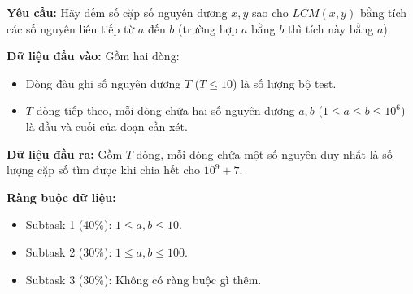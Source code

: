 \documentclass[12pt]{scrartcl}  %
\begin{document}
\textbf{Yêu cầu:}
Hãy đếm số cặp số nguyên dương $x, y$ sao cho $LCM(x, y)$ bằng tích các số nguyên liên tiếp từ $a$ đến $b$ (trường hợp $a$ bằng $b$ thì tích này bằng $a$).

\textbf{Dữ liệu đầu vào:}
Gồm hai dòng:
\begin{itemize}
    \item Dòng đàu ghi số nguyên dương $T$ ($T \leq 10$) là số lượng bộ test.
    \item $T$ dòng tiếp theo, mỗi dòng chứa hai số nguyên dương $a, b$ ($1 \leq a \leq b \leq 10^6$) là đầu và cuối của đoạn cần xét.
\end{itemize}

\textbf{Dữ liệu đầu ra:}
Gồm $T$ dòng, mỗi dòng chứa một số nguyên duy nhất là số lượng cặp số tìm được khi chia hết cho $10^9 + 7$.

\textbf{Ràng buộc dữ liệu:}
\begin{itemize}
    \item Subtask 1 (40\%): $1 \leq a, b \leq 10$.
    \item Subtask 2 (30\%): $1 \leq a, b \leq 100$.
    \item Subtask 3 (30\%): Không có ràng buộc gì thêm.
\end{itemize}
\end{document}

